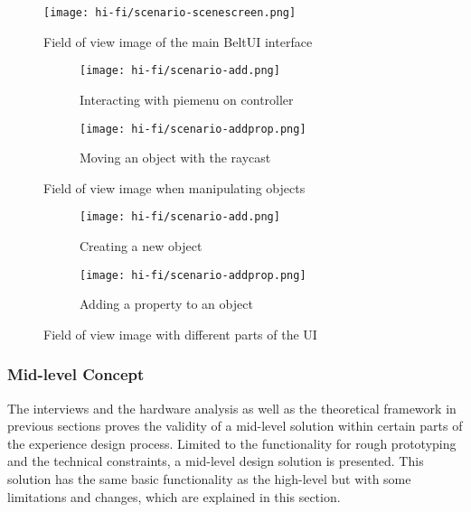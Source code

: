 
\begin{figure}
  \centering
  \texttt{[image: hi-fi/scenario-scenescreen.png]}
\caption{Field of view image of the main BeltUI interface}
\label{fig:hifi:scenario2}
\end{figure}

\begin{figure}
  \begin{subfigure}{.5\textwidth}
  \centering
  \texttt{[image: hi-fi/scenario-add.png]}
  \caption{Interacting with piemenu on controller}
  \label{fig:hifi:scenario:selector}
  \end{subfigure}%
  \begin{subfigure}{.5\textwidth}
    \centering
    \texttt{[image: hi-fi/scenario-addprop.png]}
    \caption{Moving an object with the raycast}
    \label{fig:hifi:scenario:move}
\end{subfigure}
\caption{Field of view image when manipulating objects}
\label{fig:hifi:scenario1}
\end{figure}

\begin{figure}
  \begin{subfigure}{.5\textwidth}
  \centering
  \texttt{[image: hi-fi/scenario-add.png]}
  \caption{Creating a new object}
  \label{fig:hifi:scenario:add}
  \end{subfigure}%
  \begin{subfigure}{.5\textwidth}
    \centering
    \texttt{[image: hi-fi/scenario-addprop.png]}
    \caption{Adding a property to an object}
    \label{fig:hifi:scenario:addprop}
\end{subfigure}
\caption{Field of view image with different parts of the UI}
\label{fig:hifi:scenario1}
\end{figure}

\subsubsection{Mid-level Concept}
\label{result:hifi:midlevel}
The interviews and the hardware analysis as well as the theoretical framework in previous sections proves the validity of a mid-level solution within certain parts of the experience design process. Limited to the functionality for rough prototyping and the technical constraints, a mid-level design solution is presented. This solution has the same basic functionality as the high-level but with some limitations and changes, which are explained in this section.

